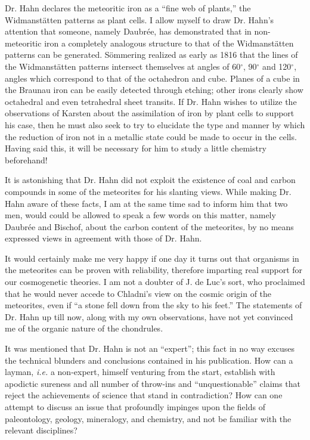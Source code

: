 \documentclass[a4paper, 12pt, oneside]{article}
\begin{document}
Dr. Hahn declares the meteoritic iron as a ``fine web of plants,'' the Widmanstätten patterns as plant cells. I allow myself to draw Dr. Hahn's attention that someone, namely Daubrée, has demonstrated that in non-meteoritic iron a completely analogous structure to that of the Widmanstätten patterns can be generated. Sömmering realized as early as 1816 that the lines of the Widmanstätten patterns intersect themselves at angles of 60$^{\circ}$, 90$^{\circ}$ and 120$^{\circ}$, angles which correspond to that of the octahedron and cube. Planes of a cube in the Braunau iron can be easily detected through etching; other irons clearly show octahedral and even tetrahedral sheet transits. If Dr. Hahn wishes to utilize the observations of Karsten about the assimilation of iron by plant cells to support his case, then he must also seek to try to elucidate the type and manner by which the reduction of iron not in a metallic state could be made to occur in the cells. Having said this, it will be necessary for him to study a little chemistry beforehand!

It is astonishing that Dr. Hahn did not exploit the existence of coal and carbon compounds in some of the meteorites for his slanting views. While making Dr. Hahn aware of these facts, I am at the same time sad to inform him that two men, would could be allowed to speak a few words on this matter, namely Daubrée and Bischof, about the carbon content of the meteorites, by no means expressed views in agreement with those of Dr. Hahn.

It would certainly make me very happy if one day it turns out that organisms in the meteorites can be proven with reliability, therefore imparting real support for our cosmogenetic theories. I am not a doubter of J. de Luc's sort, who proclaimed that he would never accede to Chladni's view on the cosmic origin of the meteorites, even if ``a stone fell down from the sky to his feet.'' The statements of Dr. Hahn up till now, along with my own observations, have not yet convinced me of the organic nature of the chondrules.

It was mentioned that Dr. Hahn is not an ``expert''; this fact in no way excuses the technical blunders and conclusions contained in his publication. How can a layman, \emph{i.e.} a non-expert, himself venturing from the start, establish with apodictic sureness and all number of throw-ins and ``unquestionable'' claims that reject the achievements of science that stand in contradiction? How can one attempt to discuss an issue that profoundly impinges upon the fields of paleontology, geology, mineralogy, and chemistry, and not be familiar with the relevant disciplines?
\end{document}
